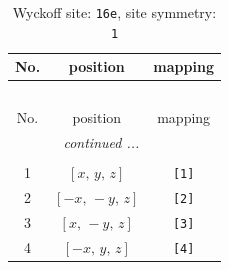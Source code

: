 \documentclass[fleqn,8pt]{jsarticle}
\begin{document}
\begin{longtable}{ccc}
\caption{Wyckoff site: {\tt 16e}, site symmetry: {\tt 1}}
 \\
 \hline \hline
No. & position & mapping \\ \hline \endfirsthead

\multicolumn{2}{l}{\tablename\ \thetable{}} \\
 \hline \hline
No. & position & mapping \\ \hline \endhead

 \hline \hline
\multicolumn{2}{r}{\footnotesize\it continued ...} \\ \endfoot

 \hline \hline
\multicolumn{2}{r}{} \\ \endlastfoot

1 & $\left[ x,\, y,\, z \right]$ & {\tt [1]} \\ \hline
2 & $\left[ - x,\, - y,\, z \right]$ & {\tt [2]} \\ \hline
3 & $\left[ x,\, - y,\, z \right]$ & {\tt [3]} \\ \hline
4 & $\left[ - x,\, y,\, z \right]$ & {\tt [4]} \\
\end{longtable}
\end{document}
